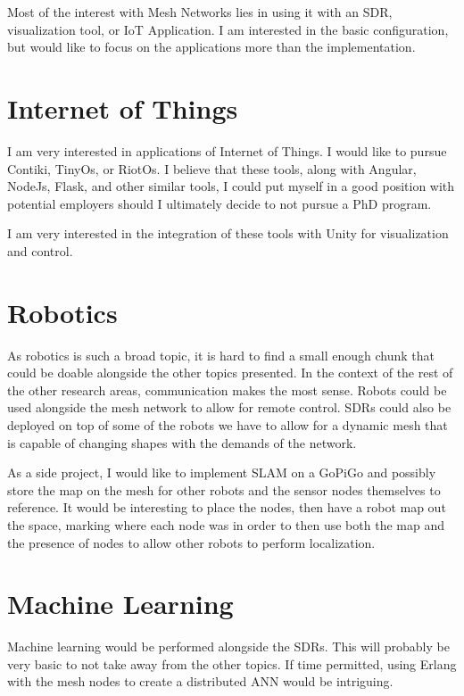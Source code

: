 \documentclass{IEEEtran}
\begin{document}
Most of the interest with Mesh Networks lies in using it with an SDR, visualization
tool, or IoT Application. I am interested in the basic configuration, but would
like to focus on the applications more than the implementation. 

\section{Internet of Things}

I am very interested in applications of Internet of Things. I would like to
pursue Contiki, TinyOs, or RiotOs. I believe that these tools, along with Angular,
NodeJs, Flask, and other similar tools, I could put myself in a good position
with potential employers should I ultimately decide to not pursue a PhD program. 

I am very interested in the integration of these tools with Unity for visualization
and control. 

\section{Robotics}

As robotics is such a broad topic, it is hard to find a small enough chunk
that could be doable alongside the other topics presented. In the context
of the rest of the other research areas, communication makes the most sense. 
Robots could be used alongside the mesh network to allow for remote control. 
SDRs could also be deployed on top of some of the robots we have to allow
for a dynamic mesh that is capable of changing shapes with the demands of the
network. 

As a side project, I would like to implement SLAM on a GoPiGo and possibly store
the map on the mesh for other robots and the sensor nodes themselves to reference.
It would be interesting to place the nodes, then have a robot map out the space,
marking where each node was in order to then use both the map and the presence of
nodes to allow other robots to perform localization. 

\section{Machine Learning}
Machine learning would be performed alongside the SDRs. This will probably be
very basic to not take away from the other topics. If time permitted,
using Erlang with the mesh nodes to create a distributed ANN would be intriguing. 
\end{document}
